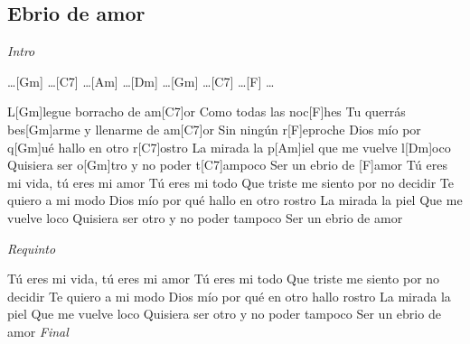 \subsection{Ebrio de amor}
\noindent

\vspace{1cm}

\begin{guitar}
	\begin{multicols}{2}
		\textit{Intro}
		\par
		\dots [Gm] \dots [C7] \dots [Am] \dots [Dm] \dots [Gm] \dots [C7] \dots [F] \dots
		\par
		L[Gm]legue borracho de am[C7]or
		Como todas las noc[F]hes
		Tu querrás bes[Gm]arme y llenarme de am[C7]or
		Sin ningún r[F]eproche
		Dios mío por q[Gm]ué hallo en otro r[C7]ostro
		La mirada la p[Am]iel que me vuelve l[Dm]oco
		Quisiera ser o[Gm]tro y no poder t[C7]ampoco
		Ser un ebrio de [F]amor
	Tú eres mi vida, tú eres mi amor
	Tú eres mi todo
	Que triste me siento por no decidir
	Te quiero a mi modo
	Dios mío por qué hallo en otro rostro
	La mirada la piel
	Que me vuelve loco
	Quisiera ser otro y no poder tampoco
	Ser un ebrio de amor

	\par
	\textit{Requinto}
	\par

	Tú eres mi vida, tú eres mi amor
	Tú eres mi todo
	Que triste me siento por no decidir
	Te quiero a mi modo
	Dios mío por qué en otro hallo rostro
	La mirada la piel
	Que me vuelve loco
	Quisiera ser otro y no poder tampoco
	Ser un ebrio de amor
		\textit{Final}
	\end{multicols}
\end{guitar}
